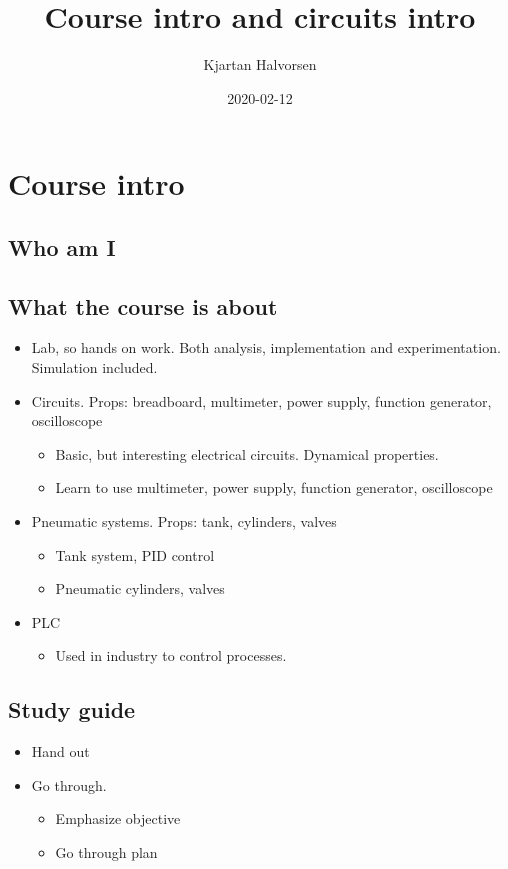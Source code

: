 \documentclass[a4paper]{scrartcl}
\author{Kjartan Halvorsen}
\date{2020-02-12}
\title{Course intro and circuits intro}
\begin{document}
\maketitle


\section{Course intro}
\label{sec-1}

\subsection{Who am I}
\label{sec-1-1}

\subsection{What the course is about}
\label{sec-1-2}
\begin{itemize}
\item Lab, so hands on work. Both analysis, implementation and experimentation. Simulation included.
\item Circuits. Props: breadboard, multimeter, power supply, function generator, oscilloscope
\begin{itemize}
\item Basic,  but interesting electrical circuits. Dynamical properties.
\item Learn to use multimeter, power supply, function generator, oscilloscope
\end{itemize}
\item Pneumatic systems. Props: tank, cylinders, valves
\begin{itemize}
\item Tank system, PID control
\item Pneumatic cylinders, valves
\end{itemize}
\item PLC
\begin{itemize}
\item Used in industry to control processes.
\end{itemize}
\end{itemize}

\subsection{Study guide}
\label{sec-1-3}
\begin{itemize}
\item Hand out
\item Go through.
\begin{itemize}
\item Emphasize objective
\item Go through plan
\end{itemize}
\end{itemize}
\end{document}
